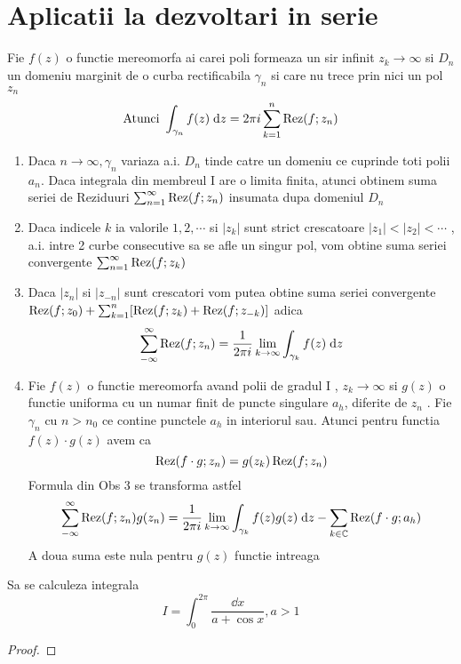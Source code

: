     \section{Aplicatii la dezvoltari in serie}

    \begin{theorem}
        Fie $f(z)$ o functie mereomorfa ai carei poli formeaza un sir infinit $z_k \to \infty$
        si $D_n$ un domeniu marginit de o curba rectificabila $\gamma_n$ si care nu trece
        prin nici un pol $z_n$
        \[
            \text{Atunci } \int_{\gamma_n} f(z) \; \mathrm{d} z = 2\pi i \sum_{k=1}^{n} \operatorname{Rez} (f;z_n)
        \]
    \end{theorem}

    \begin{observation}\leavevmode
        \begin{enumerate}
            \item Daca $n \to \infty, \gamma_n$ variaza a.i. $D_n$ tinde catre un domeniu
                ce cuprinde toti polii $a_n$. Daca integrala din membreul I are o limita finita,
                atunci obtinem suma seriei de Reziduuri $ \sum_{n=1}^{\infty}\operatorname{Rez}(f;z_n)$ insumata
                dupa domeniul $D_n$
            \item Daca indicele $k$ ia valorile $1,2,\cdots $ si $|z_k|$ sunt strict crescatoare
                $|z_1|<|z_2|< \cdots$ , a.i. intre 2 curbe consecutive sa se afle un singur pol,
                vom obtine suma seriei convergente $\sum_{n=1}^{\infty}\operatorname{Rez}(f;z_k)$
            \item Daca  $|z_n|$ si  $|z_{-n}|$ sunt crescatori vom putea obtine suma seriei
                convergente  $\operatorname{Rez}(f;z_0) + \sum_{k=1}^{n}[\operatorname{Rez}(f;z_k)+ \operatorname{Rez}(f;z_{-k})]$ adica
                \[
                    \sum_{-\infty}^{\infty} \operatorname{Rez}(f;z_n)
                        = \frac{1}{2 \pi i} \lim_{k\to \infty} \int_{\gamma_k} f(z) \; \mathrm{d} z
                \]
            \item Fie $f(z)$ o functie mereomorfa avand polii de gradul I , $z_k \to \infty$ si
                $g(z)$ o functie uniforma cu un numar finit de puncte singulare $a_h$, diferite de
                $z_n$ . Fie $\gamma_n$ cu $n>n_0$ ce contine punctele $a_h$ in interiorul sau.
                Atunci pentru functia $f(z)\cdot g(z)$ avem ca
                \[
                    \operatorname{Rez}(f\cdot g;z_n)=g(z_k) \operatorname{Rez}(f;z_n)
                \]
                Formula din Obs 3 se transforma astfel
                \[
                    \sum_{-\infty}^{\infty} \operatorname{Rez}(f;z_n) g(z_n)
                        = \frac{1}{2 \pi i} \lim_{k\to \infty} \int_{\gamma_k} f(z)g(z) \; \mathrm{d} z
                        - \sum_{k\in\mathbb{C}} \operatorname{Rez}(f\cdot g; a_h)
                \]
                A doua suma este nula pentru $g(z)$ functie intreaga
        \end{enumerate}
    \end{observation}

    \begin{aplicatie}
        Sa se calculeza integrala
        \[
            I = \int_{0}^{2 \pi} \frac{\dd x}{a + \cos x}, a>1
        \]
        \begin{proof}

        \end{proof}
    \end{aplicatie}